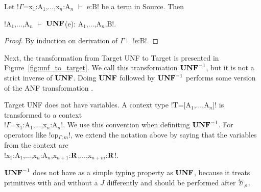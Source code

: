 \begin{lemma}
    Let !$\Gamma$=x$_1$:A$_{1}$,$\ldots$,x$_n$:A$_{n}$ $\vdash$ e:B! be a term in Source. Then
    \begin{center}
        !A$_{1}$,$\ldots$,A$_{n}$ $\vdash$ $\mathbf{UNF}$(e): A$_{1}$,$\ldots$,A$_{n}$,B!.
    \end{center}
\end{lemma}
\begin{proof}
    By induction on derivation of $\Gamma\vdash$!e:B!.
\end{proof}



Next, the transformation from Target UNF to Target is presented in Figure~\ref{fig:unf_to_target}. 
We call this transformation $\mathbf{UNF}^{-1}$, but it is not a strict inverse of $\mathbf{UNF}$.
Doing $\mathbf{UNF}$ followed by $\mathbf{UNF}^{-1}$ performs some version of the ANF transformation \cite{sabry1993reasoning}.

Target UNF does not have variables. 
A context type !T=[A$_1$,$\ldots$,A$_n$]! is transformed to a context \\
!$\Gamma$=x$_1$:A$_1$,$\ldots$,x$_n$:A$_n$!.
We use this convention when definiting $\mathbf{UNF}^{-1}$. 
For operators like !op$_{\Gamma;m}$!, we extend the notation above by saying that the variables from the context are \\
!x$_1$:A$_1$,$\ldots$,x$_n$:A$_n$,x$_{n+1}$:$\mathbf{R}$,$\ldots$,x$_{n+m}$:$\mathbf{R}$!.



$\mathbf{UNF}^{-1}$ does not have as a simple typing property as $\mathbf{UNF}$, 
because it treats primitives with and without a $J$ differently and should be performed after $\Dsynrevsymbol_{\rho}$.


